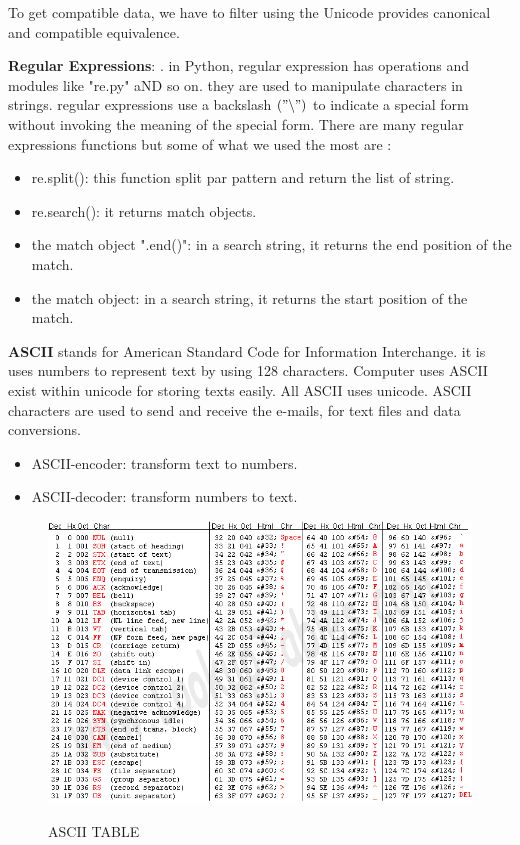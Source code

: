 \begin{itemize}
To get compatible data, we have to filter using the Unicode provides canonical and compatible equivalence.


\textbf{Regular Expressions}:
.
in Python, regular expression has operations and modules like "re.py" aND so on. they are used to manipulate characters in strings. regular expressions use a backslash $(" \backslash  ")$  to indicate a special form without invoking the meaning of the special form. There are many regular expressions functions but some of what we used the most are :
\begin{itemize}
\item re.split(): this function split par pattern and return the list of string.
\item re.search(): it returns match objects.
\item the match object ".end()": in a search string, it returns the end position of the match.
\item the match object: in a search string, it returns the start position of the match.
\end{itemize}

\textbf{ASCII} stands for American Standard Code for Information Interchange. it is uses numbers to represent text by using 128 characters. Computer uses ASCII exist within unicode for storing texts easily. All  ASCII uses unicode.
ASCII characters are used to send and receive the e-mails, for text files and data conversions. 


\begin{itemize}
\item  ASCII-encoder: transform text to numbers.
\item  ASCII-decoder: transform numbers to text.
\end{itemize}
\newpage
\begin{figure}[hbtp]
\caption{ASCII TABLE}
\centering
\includegraphics[scale=.5]{images/ASCII.png}\label{ASCII}
\end{figure}
\end{itemize}

